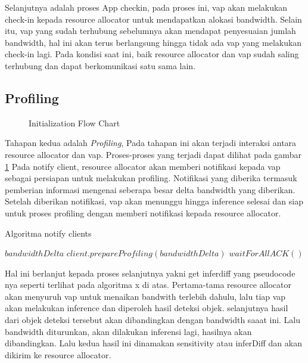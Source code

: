         Selanjutnya adalah proses App checkin, pada proses ini, \gls{vap} akan melakukan check-in kepada resource allocator untuk mendapatkan alokasi bandwidth. Selain itu, \gls{vap}
        yang sudah terhubung sebelumnya akan mendapat penyesuaian jumlah bandwidth, hal ini akan terus berlangsung hingga tidak ada \gls{vap} yang melakukan check-in lagi.
        Pada kondisi saat ini, baik resource allocator dan \gls{vap} sudah saling terhubung dan dapat berkomunikasi satu sama lain.

    \subsection{Profiling}

        \begin{figure}[tbh]
            \centering
            
            \caption{Initialization Flow Chart}\label{fig:profiling}
        \end{figure} 

        Tahapan kedua adalah \textit{Profiling}, Pada tahapan ini akan terjadi interaksi antara resource allocator dan \gls{vap}. Proses-proses yang terjadi dapat dilihat pada gambar \ref{fig:profiling}
        Pada notify client, resource allocator akan memberi notifikasi kepada \gls{vap} sebagai persiapan untuk melakukan profiling. Notifikasi yang diberika termasuk pemberian informasi mengenai seberapa
        besar delta bandwidth yang diberikan. Setelah diberikan notifikasi, \gls{vap} akan menunggu hingga inference selesai dan siap untuk proses profiling dengan memberi notifikasi kepada resource allocator.

        \begin{algorithm}[tbh]
        \caption{Algoritma notify clients}\label{alg:notifyClients}
        \begin{algorithmic}[1]
        \Require $bandwidthDelta$
        \State $client.prepareProfiling(bandwidthDelta)$
        \EndFor
        \State $waitForAllACK()$
        \end{algorithmic}
        \end{algorithm}

        Hal ini berlanjut kepada proses selanjutnya yakni get inferdiff yang pseudocode nya seperti terlihat pada algoritma x di atas. Pertama-tama resource allocator akan menyuruh vap untuk menaikan bandwith terlebih
        dahulu, lalu tiap vap akan melakukan inference dan diperoleh hasil deteksi objek. selanjutnya hasil dari objek deteksi tersebut akan dibandingkan dengan bandwidth saaat ini. Lalu bandwidth diturunkan, akan dilakukan
        inferensi lagi, hasilnya akan dibandingkan. Lalu kedua hasil ini dinamakan sensitivity atau inferDiff dan akan dikirim ke resource allocator.

